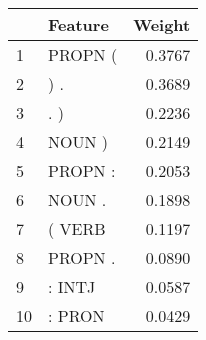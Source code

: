 \begin{tabular}{llr}
\toprule
{} &  Feature &  Weight \\
\midrule
1  &  PROPN ( &  0.3767 \\
2  &      ) . &  0.3689 \\
3  &      . ) &  0.2236 \\
4  &   NOUN ) &  0.2149 \\
5  &  PROPN : &  0.2053 \\
6  &   NOUN . &  0.1898 \\
7  &   ( VERB &  0.1197 \\
8  &  PROPN . &  0.0890 \\
9  &   : INTJ &  0.0587 \\
10 &   : PRON &  0.0429 \\
\bottomrule
\end{tabular}
